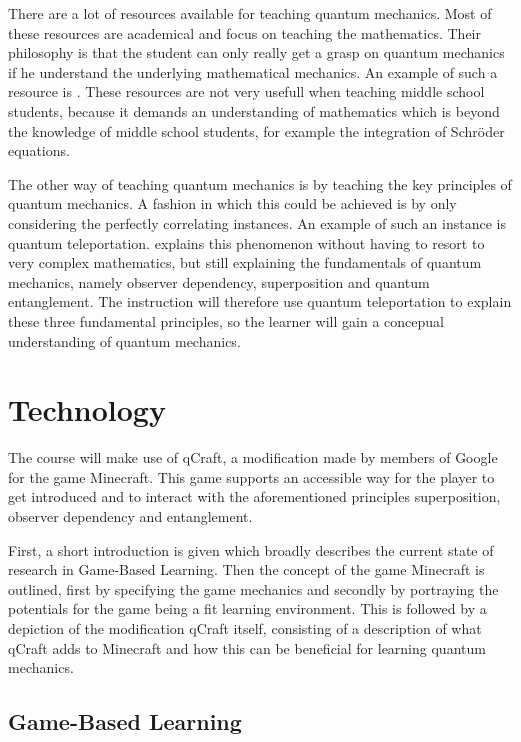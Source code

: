 \documentclass[12pt]{report} %
\begin{document}
There are a lot of resources available for teaching quantum mechanics. Most of these resources are academical and focus on teaching the mathematics. Their philosophy is that the student can only really get a grasp on quantum mechanics if he understand the underlying mathematical mechanics. An example of such a resource is . These resources are not very usefull when teaching middle school students, because it demands an understanding of mathematics which is beyond the knowledge of middle school students, for example the integration of Schröder equations.

The other way of teaching quantum mechanics is by teaching the key principles of quantum mechanics. A fashion in which this could be achieved is by only considering the perfectly correlating instances. An example of such an instance is quantum teleportation.  explains this phenomenon without having to resort to very complex mathematics, but still explaining the fundamentals of quantum mechanics, namely observer dependency, superposition and quantum entanglement. The instruction will therefore use quantum teleportation to explain these three fundamental principles, so the learner will gain a concepual understanding of quantum mechanics.

\section{Technology}

The course will make use of qCraft, a modification made by members of Google for the game Minecraft. This game supports an accessible way for the player to get introduced and to interact with the aforementioned principles superposition, observer dependency and entanglement.

First, a short introduction is given which broadly describes the current state of research in Game-Based Learning. Then the concept of the game Minecraft is outlined, first by specifying the game mechanics and secondly by portraying the potentials for the game being a fit learning environment. This is followed by a depiction of the modification qCraft itself, consisting of a description of what qCraft adds to Minecraft and how this can be beneficial for learning quantum mechanics. 

\subsection{Game-Based Learning}
\end{document}

